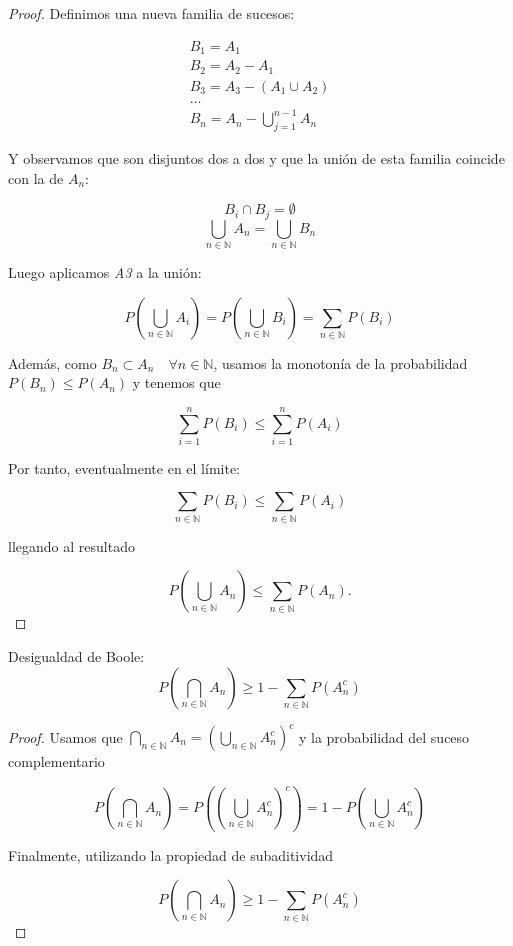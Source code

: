 \documentclass[
  a4paper,
  spanish,
  12pt,
]{scrartcl}
\begin{document}
\begin{proof}
Definimos una nueva familia de sucesos:

\begin{equation*}
\begin{aligned}
B_1 = A_1 \\
B_2 = A_2 - A_1 \\
B_3 = A_3 - (A_1 \cup A_2) \\
\dots \\
B_n = A_n - \bigcup_{j=1}^{n-1} A_n
\end{aligned}
\end{equation*}

Y observamos que son disjuntos dos a dos y que la unión de esta familia coincide con la de $A_n$:

$$B_i \cap B_j = \emptyset$$
$$\bigcup_{n \in \mathbb{N}} A_n = \bigcup_{n \in \mathbb{N}} B_n$$

Luego aplicamos \emph{A3} a la unión:

$$
P\left(\bigcup_{n \in \mathbb{N}} A_i \right) = P\left(\bigcup_{n \in \mathbb{N}} B_i \right) = \sum_{n \in \mathbb{N}} P(B_i)
$$

Además, como $B_n \subset A_n \quad \forall n \in \mathbb{N}$, usamos la monotonía de la probabilidad $P(B_n) \leq P(A_n)$ y tenemos que 

$$
\sum_{i=1}^n P(B_i) \leq \sum_{i=1}^n P(A_i)
$$

Por tanto, eventualmente en el límite:

$$
\sum_{n \in \mathbb{N}} P(B_i) \leq \sum_{n \in \mathbb{N}} P(A_i)
$$

llegando al resultado

$$
P\left(\bigcup_{n \in \mathbb{N}} A_n\right) \leq \sum_{n \in \mathbb{N}} P(A_n).
$$

\end{proof}

\begin{nprop}
Desigualdad de Boole: 
$$
P\left(\bigcap_{n \in \mathbb{N}} A_n \right) \geq 1 - \sum_{n \in \mathbb{N}} P(A_n^c)
$$
\end{nprop}

\begin{proof}

Usamos que $\bigcap_{n \in \mathbb{N}} A_n = \left(\bigcup_{n \in \mathbb{N}} A_n^c \right)^c$ y la probabilidad del suceso complementario

$$
P\left( \bigcap_{n \in \mathbb{N}}A_n \right) = 
P\left( \left(\bigcup_{n \in \mathbb{N}} A_n^c \right)^c \right) = 
1 - P\left( \bigcup_{n \in \mathbb{N}}A_n^c \right)
$$

Finalmente, utilizando la propiedad de subaditividad

$$
  P\left(\bigcap_{n \in \mathbb{N}} A_n \right) \geq 1 - \sum_{n \in \mathbb{N}} P(A_n^c)
$$
  
\end{proof}
\end{document}
